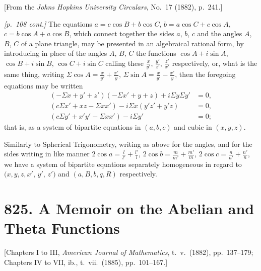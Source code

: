 \documentclass[11pt,a4paper]{book}
\begin{document}
\begin{center}
\small[From the \textit{Johns Hopkins University Circulars}, No.~17 (1882), p.~241.]
\end{center}

\bigskip

\noindent\textit{[p.~108 cont.]} The equations $a = c\cos B + b\cos C$, $b = a\cos C + c\cos A$, $c = b\cos A + a\cos B$, which connect together the sides $a$, $b$, $c$ and the angles $A$, $B$, $C$ of a plane triangle, may be presented in an algebraical rational form, by introducing in place of the angles $A$, $B$, $C$ the functions $\cos A + i\sin A$, $\cos B + i\sin B$, $\cos C + i\sin C$ calling these $\frac{x}{y'},\,\frac{y'}{z'},\,\frac{z'}{x'}$ respectively, or, what is the same thing, writing $\Sigma \cos A = \frac{x}{y'} + \frac{x'}{y}$, $\Sigma \sin A = \frac{x}{y'} - \frac{x'}{y}$, then the foregoing equations may be written
\begin{align*}
(- \Sigma x + y' + z')(- \Sigma x' + y + z) + i\Sigma y\Sigma y' &= 0,\\
(c\Sigma x' + xz - \Sigma x x') - i\Sigma x(y'z' + y'z) &= 0,\\
(c\Sigma y' + x'y' - \Sigma x x') - i\Sigma y' &= 0;
\end{align*}
that is, as a system of bipartite equations in $(a, b, c)$ and cubic in $(x, y, z)$.

Similarly to Spherical Trigonometry, writing as above for the angles, and for the sides writing in like manner $2\cos a = \frac{l}{l'} + \frac{l'}{l}$, $2\cos b = \frac{m}{m'} + \frac{m'}{m}$, $2\cos c = \frac{n}{n'} + \frac{n'}{n}$, we have a system of bipartite equations separately homogeneous in regard to $(x, y, z, x'$, $y'$, $z')$ and $(a, B, b, q, R)$ respectively.

\bigskip

\section*{825. A Memoir on the Abelian and Theta Functions}

\begin{center}
\small[Chapters I to III, \textit{American Journal of Mathematics}, t.\ v.\ (1882), pp.~137--179;\\
Chapters IV to VII, ib., t.\ vii.\ (1885), pp.~101--167.]
\end{center}
\end{document}
